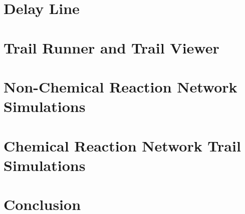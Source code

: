 \documentclass[12pt,oneside,letterpaper]{PSUreport}
\begin{document}
\glsresetall
\chapter{Delay Line}
\label{chap:delay_line}


\glsresetall
\chapter{Trail Runner and Trail Viewer}
\label{chap:trail_runner}


\glsresetall
\chapter{Non-Chemical Reaction Network Simulations}
\label{chap:non_crn_testing}


\glsresetall
\chapter{Chemical Reaction Network Trail Simulations}
\label{chap:trail_simulations}


\glsresetall
\chapter{Conclusion}
\label{chap:conclusion}







\appendix

\end{document}
